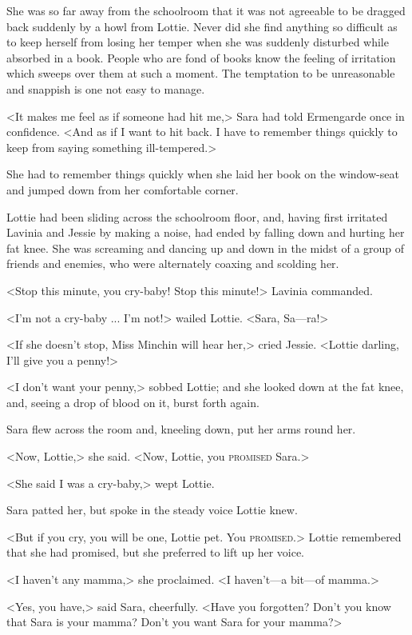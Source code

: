 She was so far away from the schoolroom that it was not agreeable to be dragged back suddenly by a howl from Lottie. Never did she find anything so difficult as to keep herself from losing her temper when she was suddenly disturbed while absorbed in a book. People who are fond of books know the feeling of irritation which sweeps over them at such a moment. The temptation to be unreasonable and snappish is one not easy to manage.

<It makes me feel as if someone had hit me,> Sara had told Ermengarde once in confidence. <And as if I want to hit back. I have to remember things quickly to keep from saying something ill-tempered.>

She had to remember things quickly when she laid her book on the window-seat and jumped down from her comfortable corner.

Lottie had been sliding across the schoolroom floor, and, having first irritated Lavinia and Jessie by making a noise, had ended by falling down and hurting her fat knee. She was screaming and dancing up and down in the midst of a group of friends and enemies, who were alternately coaxing and scolding her.

<Stop this minute, you cry-baby! Stop this minute!> Lavinia commanded.

<I'm not a cry-baby ... I'm not!> wailed Lottie. <Sara, Sa—ra!>

<If she doesn't stop, Miss Minchin will hear her,> cried Jessie. <Lottie darling, I'll give you a penny!>

<I don't want your penny,> sobbed Lottie; and she looked down at the fat knee, and, seeing a drop of blood on it, burst forth again.

Sara flew across the room and, kneeling down, put her arms round her.

<Now, Lottie,> she said. <Now, Lottie, you \textsc{promised} Sara.>

<She said I was a cry-baby,> wept Lottie.

Sara patted her, but spoke in the steady voice Lottie knew.

<But if you cry, you will be one, Lottie pet. You \textsc{promised}.> Lottie remembered that she had promised, but she preferred to lift up her voice.

<I haven't any mamma,> she proclaimed. <I haven't—a bit—of mamma.>

<Yes, you have,> said Sara, cheerfully. <Have you forgotten? Don't you know that Sara is your mamma? Don't you want Sara for your mamma?>

